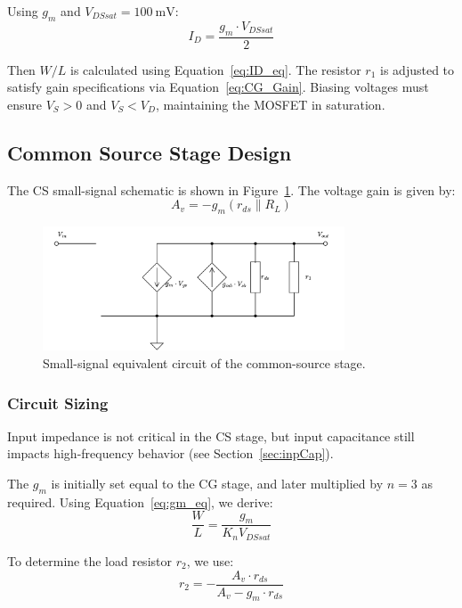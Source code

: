 Using $g_m$ and $V_{DSsat} = \SI{100}{\milli\volt}$:
\[
I_D = \frac{g_m \cdot V_{DSsat}}{2}
\]

Then $W/L$ is calculated using Equation~\ref{eq:ID_eq}. The resistor $r_1$ is adjusted to satisfy gain specifications via Equation~\ref{eq:CG_Gain}. Biasing voltages must ensure $V_S > 0$ and $V_S < V_D$, maintaining the MOSFET in saturation.

\subsection{Common Source Stage Design}

The CS small-signal schematic is shown in Figure~\ref{fig:CS_SmallSignal}. The voltage gain is given by:
\begin{equation}
    A_v = -g_m (r_{ds} \parallel R_L)
    \label{eq:CS_Gain}
\end{equation}

\begin{figure}[H]
    \centering
    \includegraphics[width=0.8\textwidth]{Images/CS_SmallSig.png}
    \caption{Small-signal equivalent circuit of the common-source stage.}
    \label{fig:CS_SmallSignal}
\end{figure}

\subsubsection{Circuit Sizing}

Input impedance is not critical in the CS stage, but input capacitance still impacts high-frequency behavior (see Section~\ref{sec:inpCap}).

The $g_m$ is initially set equal to the CG stage, and later multiplied by $n = 3$ as required. Using Equation~\ref{eq:gm_eq}, we derive:
\begin{equation}
    \frac{W}{L} = \frac{g_{m}}{K_n V_{DSsat}} 
    \label{eq:wl2}
\end{equation}

To determine the load resistor $r_2$, we use:
\begin{equation}
    r_2 = -\frac{A_v \cdot r_{ds}}{A_v - g_m \cdot r_{ds}} 
    \label{eq:r2}
\end{equation}

